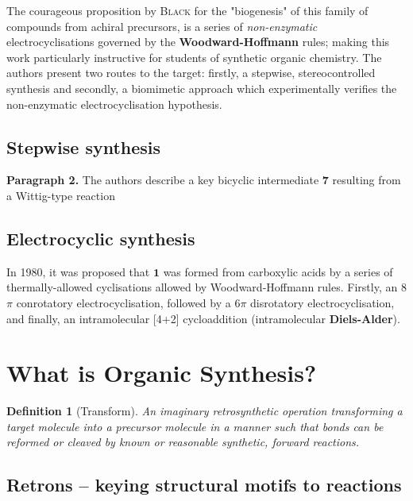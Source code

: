 \documentclass[a4paper]{tufte-handout}
\newtheorem{definition}{Definition}
\begin{document}
The courageous proposition by {\small \textsc{Black}} for the "biogenesis" of this family of compounds from achiral precursors, 
is a series of \textit{non-enzymatic} electrocyclisations governed by the \textbf{Woodward-Hoffmann} rules; making this work 
particularly instructive for students of synthetic organic chemistry. The authors present two routes to the target: firstly, a stepwise, stereocontrolled synthesis \cite{nicolaou1982endiandricA}
and secondly, a biomimetic approach which experimentally verifies the non-enzymatic electrocyclisation hypothesis.

\subsection{Stepwise synthesis}

\textbf{Paragraph 2.} The authors describe a key bicyclic intermediate \textbf{7} resulting from a Wittig-type reaction

\subsection{Electrocyclic synthesis}

In 1980, it was proposed that $\mathbf{1}$ was formed from carboxylic acids by a series of thermally-allowed cyclisations allowed by Woodward-Hoffmann 
rules.\cite{nicolaou1982endiandricB} Firstly, an 8$\pi$ 
conrotatory electrocyclisation, followed by a 6$\pi$ disrotatory electrocyclisation, and finally, an intramolecular [4+2]
cycloaddition (intramolecular \textbf{Diels-Alder}).

\pagebreak

\section*{What is Organic Synthesis?}

\begin{definition}[Transform]
  An imaginary retrosynthetic operation transforming a target molecule into a precursor molecule in a manner 
  such that bonds can be reformed or cleaved by known or reasonable synthetic, forward reactions.
\end{definition}

\subsection*{Retrons -- keying structural motifs to reactions}
\end{document}
